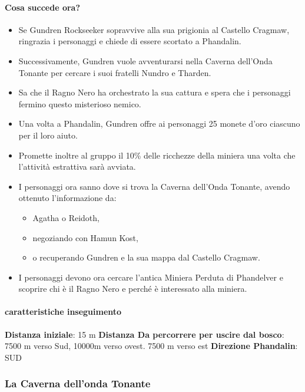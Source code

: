 \documentclass{article}
\begin{document}
\paragraph{Cosa succede ora?}
\begin{itemize}
    \item Se Gundren Rockseeker sopravvive alla sua prigionia al Castello Cragmaw, ringrazia i personaggi e chiede di essere scortato a Phandalin.
    \item Successivamente, Gundren vuole avventurarsi nella Caverna dell’Onda Tonante per cercare i suoi fratelli Nundro e Tharden.
    \item Sa che il Ragno Nero ha orchestrato la sua cattura e spera che i personaggi fermino questo misterioso nemico.
    \item Una volta a Phandalin, Gundren offre ai personaggi 25 monete d'oro ciascuno per il loro aiuto.
    \item Promette inoltre al gruppo il 10\% delle ricchezze della miniera una volta che l'attività estrattiva sarà avviata.
    \item I personaggi ora sanno dove si trova la Caverna dell’Onda Tonante, avendo ottenuto l'informazione da:
    \begin{itemize}
        \item Agatha o Reidoth,
        \item negoziando con Hamun Kost,
        \item o recuperando Gundren e la sua mappa dal Castello Cragmaw.
    \end{itemize}
    \item I personaggi devono ora cercare l'antica Miniera Perduta di Phandelver e scoprire chi è il Ragno Nero e perché è interessato alla miniera.
\end{itemize}



\paragraph{caratteristiche inseguimento}
    \textbf{Distanza iniziale}: 15 m 
    \textbf{Distanza Da percorrere per uscire dal bosco}: 7500 m verso Sud, 10000m verso ovest. 7500 m verso est
    \textbf{Direzione Phandalin}: SUD
    
\subsubsection{La Caverna dell'onda Tonante}
\end{document}

